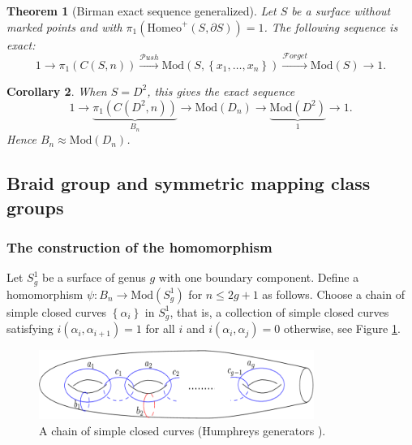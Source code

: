 \documentclass[reqno]{amsart}
\newtheorem{theorem}{Theorem}[section]
\newtheorem{corollary}[theorem]{Corollary}
\theoremstyle{definition}
\theoremstyle{remark}
\newcommand{\Mod}{{\mathrm{Mod}}}
\newcommand{\Homeo}{{\mathrm{Homeo}}}
\newcommand{\Push}{{\mathcal{P}}ush}
\newcommand{\Forget}{{\mathcal{F}}orget}
\begin{document}
 \begin{theorem}[Birman exact sequence generalized]
     Let $S$ be a surface without marked points
     and with $\pi_1 \left( \Homeo^{+} \left( 
     S, \partial S\right)  \right) = 1$. The following
     sequence is exact:
     \[
     1 \to \pi_1 \left( C \left( S,n \right)  \right) 
     \stackrel{\Push}{\to } \Mod \left( S,
     \left\{ x_1, \ldots, x_n \right\} \right) 
     \stackrel{\Forget}{\to } \Mod (S) \to 1.
     \] 
 \end{theorem}


 \begin{corollary}
     When $S = D^2$, this gives the exact sequence
     \[
         1 \to
         \underbrace{\pi_1 \left( C \left( D^2,n \right)\right)}_{B_n}
     \to \Mod \left( D_n \right) \to 
     \underbrace{\Mod \left( D^2 \right)}_{1} \to 1.
     \] 
     Hence $B_n \approx \Mod \left( D_n \right) $.
 \end{corollary}





 \subsection{Braid group and symmetric mapping class groups}

 \subsubsection{The construction of the
 homomorphism}\label{birman-hilden-embedding-construction}

 Let $S_{g}^{1}$ be a surface of genus $g$ with
 one boundary component. Define a
 homomorphism $\psi \colon B_n \to 
 \Mod \left( S_g^{1} \right) $ for
 $n \le 2g+1$ as follows.
 Choose a chain of simple closed curves
 $\left\{ \alpha_i \right\} $ in
 $S_{g}^{1}$, that is, a collection of
 simple closed curves satisfying
 $i \left( \alpha_i, \alpha_{i+1} \right) =1$ for
 all $i$ and $i \left( \alpha_i, \alpha_j \right) =0$ otherwise,
 see Figure \ref{fig:Humphreys-generators-png}.

 \begin{figure}[htpb]
     \centering
     \includegraphics[width=0.8\textwidth]{Humphreys-generators.png}
     \caption{A chain of simple closed curves (Humphreys generators ).
     }
     \label{fig:Humphreys-generators-png}
 \end{figure}
\end{document}
